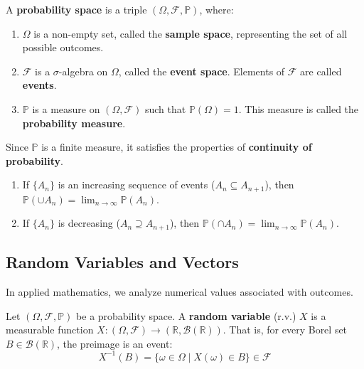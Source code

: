 \documentclass[oneside]{book}
\begin{document}
\begin{definition}
A \textbf{probability space} is a triple $(\Omega, \mathcal{F}, \mathbb{P})$, where:
\begin{enumerate}
    \item $\Omega$ is a non-empty set, called the \textbf{sample space}, representing the set of all possible outcomes.
    \item $\mathcal{F}$ is a $\sigma$-algebra on $\Omega$, called the \textbf{event space}. Elements of $\mathcal{F}$ are called \textbf{events}.
    \item $\mathbb{P}$ is a measure on $(\Omega, \mathcal{F})$ such that $\mathbb{P}(\Omega) = 1$. This measure is called the \textbf{probability measure}.
\end{enumerate}
\end{definition}

Since $\mathbb{P}$ is a finite measure, it satisfies the properties of \textbf{continuity of probability}.

\begin{proposition}[Continuity]
\begin{enumerate}
    \item If $\{A_n\}$ is an increasing sequence of events ($A_n \subseteq A_{n+1}$), then $\mathbb{P}(\cup A_n) = \lim_{n \to \infty} \mathbb{P}(A_n)$.
    \item If $\{A_n\}$ is decreasing ($A_n \supseteq A_{n+1}$), then $\mathbb{P}(\cap A_n) = \lim_{n \to \infty} \mathbb{P}(A_n)$.
\end{enumerate}
\end{proposition}

\subsection{Random Variables and Vectors}

In applied mathematics, we analyze numerical values associated with outcomes.

\begin{definition}
Let $(\Omega, \mathcal{F}, \mathbb{P})$ be a probability space. A \textbf{random variable} (r.v.) $X$ is a measurable function $X: (\Omega, \mathcal{F}) \to (\mathbb{R}, \mathcal{B}(\mathbb{R}))$.
That is, for every Borel set $B \in \mathcal{B}(\mathbb{R})$, the preimage is an event:
\[ X^{-1}(B) = \{ \omega \in \Omega \mid X(\omega) \in B \} \in \mathcal{F} \]
\end{definition}
\end{document}
